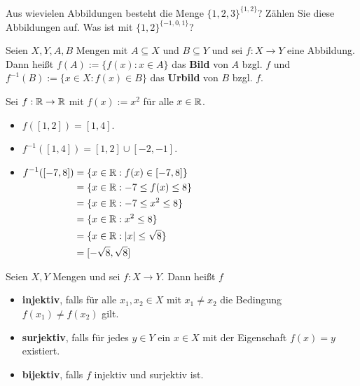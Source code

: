 \begin{aufg}
	Aus wievielen Abbildungen besteht die Menge $\{1,2,3\}^{\{1,2\}}$? Zählen Sie diese Abbildungen auf. Was ist  mit $\{1,2\}^{\{-1,0,1\}}$?
\end{aufg} 

\begin{defn}
Seien $ X,Y,A,B $ Mengen mit $ A \subseteq X $ und $ B \subseteq Y $ und sei $ f : X \to Y $ eine Abbildung. Dann heißt $ f(A) := \{ f(x) : x \in A \} $ das \textbf{Bild} von $ A $ bzgl. $ f $ und $ f^{-1}(B) := \{ x \in X : f(x) \in B \} $ das \textbf{Urbild} von $ B $ bzgl. $ f $.
\end{defn} 

\begin{bsp}
	Sei $ f : \mathbb{R} \to \mathbb{R} $ mit $ f(x) := x^2 $ für alle $ x \in \mathbb{R} $.
	\begin{itemize}
		\item $ f( [1,2] ) = [1,4] $. 
		\item $ f^{-1}( [1,4] ) = [1,2] \cup [-2,-1] $. 
		\item
		$ \begin{aligned}[t]
			f^{-1}( [-7,8] ) &= \{ x \in \mathbb{R} : f(x) \in [-7,8] \} \\
			&= \{ x \in \mathbb{R} : -7 \leq f(x) \leq 8 \} \\
			&= \{ x \in \mathbb{R} : -7 \leq x^2 \leq 8 \} \\
			&= \{ x \in \mathbb{R} : x^2 \leq 8 \} \\
			&= \{ x \in \mathbb{R} : |x| \leq \sqrt{8} \} \\
			&= [-\sqrt{8},\sqrt{8}]
		\end{aligned} $
\end{itemize}
\end{bsp}


\begin{defn}
Seien $ X,Y $ Mengen und sei $ f : X \to Y $. Dann heißt $ f $
\begin{itemize}
	\item \textbf{injektiv}, falls für alle $ x_1, x_2 \in X$ mit $ x_1 \neq x_2 $ die Bedingung $ f(x_1) \neq f(x_2) $ gilt.
	\item \textbf{surjektiv}, falls für jedes $ y \in Y $ ein $ x \in X $ mit der Eigenschaft $ f(x) = y $ existiert.
	\item \textbf{bijektiv}, falls $ f $ injektiv und surjektiv ist.
\end{itemize}
\end{defn}

